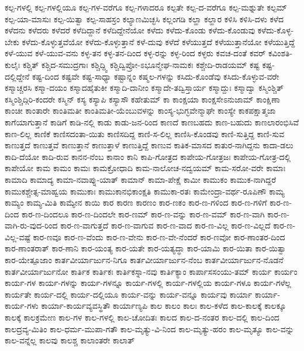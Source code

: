 {ಕಲ್ಪ-ಗಳಲ್ಲಿ
ಕಲ್ಪ-ಗಳಲ್ಲಿಯೂ
ಕಲ್ಪ-ಗಳ-ವರೆಗೂ
ಕಲ್ಪ-ಗಳಾದರೂ
ಕಲ್ಪತೇ
ಕಲ್ಪ-ದ-ವರೆಗೂ
ಕಲ್ಪ-ಮಶ್ನುತೇ
ಕಲ್ಪಮ್
ಕಲ್ಪ-ಯಾ-ಮಾಸುಃ
ಕಲ್ಪ-ಯಿತ್ವಾ
ಕಲ್ಪ-ಸಾಹಸ್ರಂ
ಕಲ್ಯಾಣಮಿಚ್ಛಸಿ
ಕಲ್ಲಂಗಡಿ
ಕಲ್ಹಾ
ಕಲ್ಹಾರ
ಕಳಿಸಿ
ಕಳಿಸಿ-ದಳು
ಕಳೆದ
ಕಳೆದನು
ಕಳೆದರು
ಕಳೆದರೆ
ಕಳೆದಿದ್ದಾನೆ
ಕಳೆದಿದ್ದೇನೆಯೋ
ಕಳೆದು
ಕಳೆದು-ಕೊಂಡು
ಕಳೆದು-ಕೊಂಡುವು
ಕಳೆದು-ಕೊಳ್ಳ-ಬೇಕು
ಕಳೆದು-ಕೊಳ್ಳುತ್ತವೆಯೋ
ಕಳೆದು-ಕೊಳ್ಳುತ್ತಾನೆ
ಕಳೆ-ದುವು
ಕಳೆದೆ
ಕಳೆಯುತ್ತದೆ
ಕಳೆಯುತ್ತಾನೆಯೋ
ಕಳೆಯುತ್ತಿದ್ದೆ
ಕಳೆ-ಯುವ
ಕಳೆ-ಯುವ-ವನು
ಕಳ್ಳ-ತನ
ಕಳ್ಳ-ತನ-ದಿಂದ
ಕಳ್ಳ-ರನ್ನು
ಕಳ್ಳ-ರಿಂದ
ಕಳ್ಳರು
ಕವಚ-ದಂತೆ
ಕವರ್
ಕವಿಂಶತಿ-ಕುಲೈಃ
ಕಶ್ಚಿತ್
ಕಶ್ಚಿದ-ಸಮುದ್ರಗಾಃ
ಕಶ್ಚಿದ್ದ್ವಿ
ಕಶ್ಚಿದ್ವಿಪ್ರೋ-ಽಭೂನ್ಮೇಘ-ನಾಮಕಃ
ಕಶ್ಚೇದಿ-ರಾಡಯಮ್
ಕಷ್ಟ
ಕಷ್ಟ-ದಲ್ಲಿದ್ದೇನೆ
ಕಷ್ಟ-ದಿಂದ
ಕಷ್ಟವೇ
ಕಷ್ಟ-ಸಾಧ್ಯಾ
ಕಷ್ಟಾನ್ನಂ
ಕಷ್ಮಲ-ಗಳನ್ನು
ಕಸಿದು-ಕೊಂಡೆವು
ಕಸಿದು-ಕೊಳ್ಳುವ-ವರೇ
ಕಸ್ಮಾಚ್ಚರಸಿ
ಕಸ್ಮಾ-ದಯಂ
ಕಸ್ಮಾದಹೈತುಕೀ
ಕಸ್ಮಾದಿ-ದಾನೀಂ
ಕಸ್ಮಾದೇ-ತದ್ವಿಸ್ತಾರ್ಯ
ಕಸ್ಮಾದ್ದುಃ
ಕಸ್ಮಾದ್ವಾ
ಕಸ್ಮಿಂಶ್ಚಿತ್
ಕಸ್ಮಿಂಶ್ಚಿದ್ಗಿರಿ-ಕಂದರೇ
ಕಸ್ಮಿನ್
ಕಸ್ಯ
ಕಸ್ಯಾಪಿ
ಕಸ್ಯಾಸೌ
ಕಹೇತುಮ್
ಕಾ
ಕಾಂಕ್ಷಯಾ
ಕಾಂಕ್ಷಸೇಽನುಜಾಮ್
ಕಾಂಕ್ಷಿಣಾ
ಕಾಂಚೀ
ಕಾಂತಾರೇ
ಕಾಂತಿಮತೀ
ಕಾಂತಿಮತೀ-ಯೆಂಬುವಳನ್ನು
ಕಾಂಸ್ಯ-ಭುಗ್ಭವೇನ್ಮಾಘೇ
ಕಾಂಸ್ಯೇ
ಕಾಕಪಕ್ಷಾತ್ಮಜಾ
ಕಾಗೆಯಾಗುತ್ತಾನೆ
ಕಾಡಿಗೆ
ಕಾಡಿ-ನಲ್ಲಿ
ಕಾಡು
ಕಾಡು-ಜನ-ರಿಂದ
ಕಾಣದೆ
ಕಾಣಬಹದು
ಕಾಣ-ಬಹುದು
ಕಾಣಲಾರಂಭಿಸಿವೆ
ಕಾಣ-ಲಿಲ್ಲ
ಕಾಣಿಕೆ
ಕಾಣಿಸದಂತಾ-ಯಿತು
ಕಾಣಿಸದಿದ್ದ
ಕಾಣಿ-ಸ-ಲಿಲ್ಲ
ಕಾಣಿಸಿ-ಕೊಂಡವು
ಕಾಣಿ-ಸುತ್ತಿದ್ದ
ಕಾಣಿ-ಸುವ
ಕಾಣುತ್ತದೆ
ಕಾಣುತ್ತವೆ
ಕಾಣುತ್ತಾನೆ
ಕಾಣುತ್ತಾಳೆ
ಕಾಣುತ್ತಿದ್ದೆ
ಕಾಣುವ
ಕಾತಿಕ-ಮಾಸದ
ಕಾತುರ-ನಾಗಿದ್ದನು
ಕಾದಾ-ಡಲು
ಕಾದಿ-ದೆಯೋ
ಕಾದಿ-ರುವ
ಕಾನನ-ನೆಂಬ
ಕಾನಾಂ
ಕಾನಿ
ಕಾಪಿ-ಗೋತ್ರದ
ಕಾಪೇಯ-ಗೋತ್ರಜಃ
ಕಾಪೇಯ-ಗೋತ್ರ-ದಲ್ಲಿ
ಕಾಪೇಯೋ
ಕಾಮ
ಕಾಮಂ
ಕಾಮಃ
ಕಾಮಕ್ರೋಧಾದಿ
ಕಾಮ-ನಾಲೋಚ-ನದ್ವಯಮ್
ಕಾಮ-ಸರೋ-ವರೇ
ಕಾಮಾಃ
ಕಾಮಾದಿ
ಕಾಮಾದ್ಯ
ಕಾಮಾ-ನವಾಪ್ನು-ಯಾತ್
ಕಾಮಾನ್
ಕಾಮಾ-ಪೇಕ್ಷೆ
ಕಾಮೀ
ಕಾಮುಕಂ
ಕಾಮುಕ-ನಾಗಿದ್ದರೆ
ಕಾಮುಕಶ್ಚೇತ್ಸ-ಮಾಹ್ವಯ
ಕಾಮುಕಾಃ
ಕಾಮುಕಾನಭಿಕಾಂಕ್ಷತಿ
ಕಾಮುಕಾ-ರತಃ
ಕಾಮೇಂದ್ರಾ-ವರ್ಥ-ರೂಪಿಣೌ
ಕಾಮ್ಯ
ಕಾಮ್ಯಂ
ಕಾಮ್ಯ-ಮಿತಿ
ಕಾಮ್ಯೇನ
ಕಾಯಿ
ಕಾರ
ಕಾರಣ
ಕಾರಣಂ
ಕಾರ-ಣಕಂ
ಕಾರ-ಣ-ಗಳಿಂದ
ಕಾರ-ಣ-ಗಳಿಗೆ
ಕಾರ-ಣ-ದಿಂದ
ಕಾರ-ಣ-ದಿಂದಲೂ
ಕಾರ-ಣ-ದಿಂದಲೇ
ಕಾರ-ಣಮ್
ಕಾರ-ಣ-ವನ್ನು
ಕಾರ-ಣ-ವಮ್
ಕಾರ-ಣ-ವಾಗಿ
ಕಾರ-ಣ-ವಾಗಿ-ರು-ವುದ-ರಿಂದ
ಕಾರ-ಣ-ವಾಗುತ್ತದೆ
ಕಾರ-ಣ-ವಾಗುವ
ಕಾರ-ಣ-ವಾದ
ಕಾರ-ಣ-ವಿಲ್ಲ
ಕಾರ-ಣ-ವಿಲ್ಲದೆ
ಕಾರ-ಣ-ವಿಲ್ಲ-ವಷ್ಟೆ
ಕಾರ-ಣವೂ
ಕಾರ-ಣ-ವೆಂದು
ಕಾರ-ಣ-ವೇನು
ಕಾರ-ಣ-ವೇ-ನೆಂದರೆ
ಕಾರ-ಣವೋ
ಕಾರ-ಣಾಂತರ-ದಿಂದ
ಕಾರ-ಣಾಂತರಾತ್
ಕಾರ-ಣಾನಿ
ಕಾರ-ಯಂತ್ಯ
ಕಾರ-ಯತೇ
ಕಾರ-ಯತ್ಯದ್ಧಾ
ಕಾರ-ಯಾಮಿ
ಕಾರ-ಯಿತಾ
ಕಾರ-ಯಿತ್ವಾ
ಕಾರ-ಯೇತ್ಪೂಜಾಂ
ಕಾರ್ತವೀರ್ಯಾರ್ಜುನ-ನಿಗೂ
ಕಾರ್ತವೀರ್ಯಾರ್ಜುನ-ನೆಂಬ
ಕಾರ್ತವೀರ್ಯಾರ್ಜುನ-ನೊಡನೆ
ಕಾರ್ತವೀರ್ಯಾರ್ಜುನೋ
ಕಾರ್ತಿಕ
ಕಾರ್ತಿಕಃ
ಕಾರ್ತಿಕಸ್ನಾ-ನವು
ಕಾರ್ತಿಕ್ಯಾಂ
ಕಾರ್ಪಾಸಸಂಯು-ತಮ್
ಕಾರ್ಯ
ಕಾರ್ಯಂ
ಕಾರ್ಯ-ಗಳ
ಕಾರ್ಯ-ಗಳನ್ನು
ಕಾರ್ಯ-ಗಳನ್ನೂ
ಕಾರ್ಯ-ಗಳಲ್ಲಿ
ಕಾರ್ಯ-ಗಳಲ್ಲಿಯ
ಕಾರ್ಯ-ಗಳೂ
ಕಾರ್ಯ-ಗಳೆಲ್ಲ
ಕಾರ್ಯತೇ
ಕಾರ್ಯ-ದಲ್ಲಿ
ಕಾರ್ಯ-ದಲ್ಲಿಯೂ
ಕಾರ್ಯ-ವನ್ನು
ಕಾರ್ಯ-ವನ್ನೂ
ಕಾರ್ಯವು
ಕಾರ್ಯಾ
ಕಾರ್ಯಾ-ಕಾರ್ಯ-ಗಳು
ಕಾರ್ಯಾ-ಕಾರ್ಯವ್ಯವಸ್ಥಿತೌ
ಕಾರ್ಯಾಣ್ಯಪಿ
ಕಾಲ
ಕಾಲಂ
ಕಾಲಃ
ಕಾಲ-ಕಳೆದ
ಕಾಲ-ಕಾಲಕ್ಕೆ
ಕಾಲಕ್ಕೂ
ಕಾಲಕ್ಕೆ
ಕಾಲಕ್ರಮೇಣ
ಕಾಲ-ಗಳ
ಕಾಲ-ಗಳಲ್ಲಿ
ಕಾಲ-ಚೋದಿತಃ
ಕಾಲದ
ಕಾಲ-ದ-ನಂತರ
ಕಾಲ-ದಲ್ಲಿ
ಕಾಲ-ದಿಂದ
ಕಾಲದ್ರವ್ಯ-ಮಿತಿಂ
ಕಾಲ-ಧರ್ಮ-ಮುಪಾ-ಗತೌ
ಕಾಲ-ಮೃತ್ಯು-ವಿ-ನಿಂದ
ಕಾಲ-ಮೃತ್ಯು-ಹರಂ
ಕಾಲ-ಮೃತ್ಯೂ
ಕಾಲ-ವನ್ನು
ಕಾಲ-ವನ್ನೆಲ್ಲ
ಕಾಲವು
ಕಾಲಶ್ಚ
ಕಾಲಾಂತರೇ
ಕಾಲಾತ್
}
